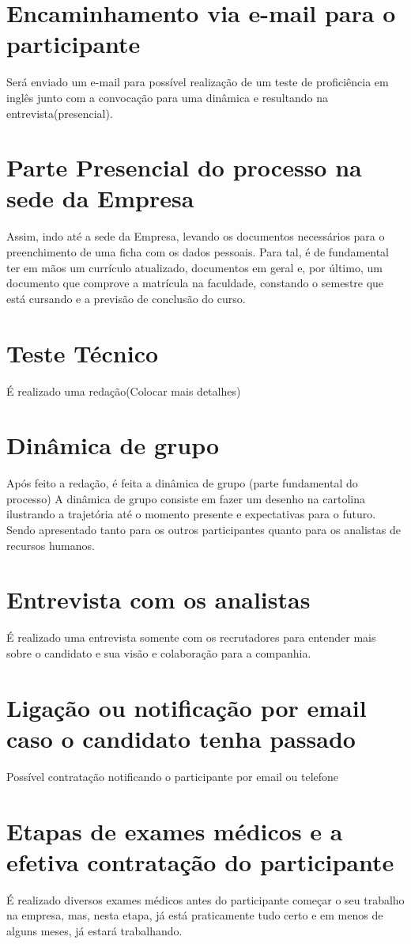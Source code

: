 \section{Encaminhamento via e-mail para o participante}
Será enviado um e-mail para possível realização de um teste de proficiência em inglês junto com a convocação para uma dinâmica e resultando na entrevista(presencial).

\section{ Parte Presencial do processo na sede da Empresa}
Assim, indo até a sede da Empresa, levando os documentos necessários para o preenchimento de uma ficha com os dados pessoais. Para tal, é de fundamental ter em mãos um currículo atualizado, documentos em geral e, por último, um documento que comprove a matrícula na faculdade, constando o semestre que está cursando e a previsão de conclusão do curso.

\section{ Teste Técnico}
É realizado uma redação(Colocar mais detalhes)

\section{ Dinâmica de grupo}
Após feito a {redação}, é feita a dinâmica de grupo (parte fundamental do processo)
A dinâmica de grupo consiste em fazer um desenho na cartolina ilustrando a trajetória até o momento presente e expectativas para o futuro. Sendo apresentado tanto para os outros participantes quanto para os analistas de recursos humanos.

\section{ Entrevista com os analistas}
É realizado uma entrevista somente com os recrutadores para entender mais sobre o candidato e sua visão e colaboração para a companhia.

\section{ Ligação ou notificação por email caso o candidato tenha passado}
Possível contratação notificando o participante por email ou telefone

\section{ Etapas de exames médicos e a efetiva contratação do participante}
É realizado diversos exames médicos antes do participante começar o seu trabalho na empresa, mas, nesta etapa, já está praticamente tudo certo e em menos de alguns meses, já estará trabalhando.








